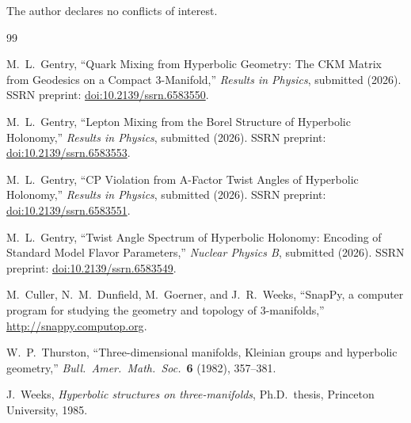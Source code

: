 \documentclass[12pt]{article}
\theoremstyle{definition}
\begin{document}
The author declares no conflicts of interest.

\begin{thebibliography}{99}

  M.~L.~Gentry,
  ``Quark Mixing from Hyperbolic Geometry: The CKM Matrix from Geodesics
  on a Compact 3-Manifold,''
  \textit{Results in Physics}, submitted (2026).
  SSRN preprint: \href{https://doi.org/10.2139/ssrn.6583550}
  {doi:10.2139/ssrn.6583550}.

  M.~L.~Gentry,
  ``Lepton Mixing from the Borel Structure of Hyperbolic Holonomy,''
  \textit{Results in Physics}, submitted (2026).
  SSRN preprint: \href{https://doi.org/10.2139/ssrn.6583553}
  {doi:10.2139/ssrn.6583553}.

  M.~L.~Gentry,
  ``CP Violation from A-Factor Twist Angles of Hyperbolic Holonomy,''
  \textit{Results in Physics}, submitted (2026).
  SSRN preprint: \href{https://doi.org/10.2139/ssrn.6583551}
  {doi:10.2139/ssrn.6583551}.

  M.~L.~Gentry,
  ``Twist Angle Spectrum of Hyperbolic Holonomy: Encoding of Standard
  Model Flavor Parameters,''
  \textit{Nuclear Physics B}, submitted (2026).
  SSRN preprint: \href{https://doi.org/10.2139/ssrn.6583549}
  {doi:10.2139/ssrn.6583549}.

  M.~Culler, N.~M.~Dunfield, M.~Goerner, and J.~R.~Weeks,
  ``SnapPy, a computer program for studying the geometry and topology
  of 3-manifolds,''
  \url{http://snappy.computop.org}.

  W.~P.~Thurston,
  ``Three-dimensional manifolds, Kleinian groups and hyperbolic
  geometry,''
  \textit{Bull.\ Amer.\ Math.\ Soc.}\ \textbf{6} (1982), 357--381.

  J.~Weeks,
  \textit{Hyperbolic structures on three-manifolds},
  Ph.D.\ thesis, Princeton University, 1985.

\end{thebibliography}
\end{document}
